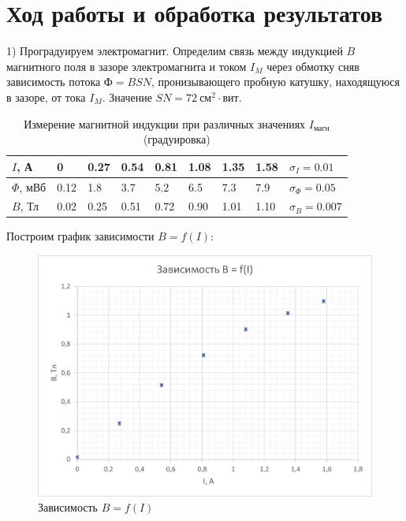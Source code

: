 \documentclass[a4paper, 14pt]{article}
\begin{document}
	\section*{Ход работы и обработка результатов}
	
	 1) Проградуируем электромагнит. Определим связь между индукцией $B$ магнитного поля в зазоре электромагнита и током $I_M$ через обмотку сняв зависимость потока $\text{Ф} = BSN$, пронизывающего пробную катушку, находящуюся в зазоре, от тока $I_M$. Значение $SN = 72~\text{см}^2 \cdot \text{вит}$.
		\begin{table}[h]
			\centering
			\begin{tabular}{|l|l|l|l|l|l|l|l|l|}
				\hline
				$I$, А  & 0 & 0.27 & 0.54  & 0.81   & 1.08     & 1.35   & 1.58 & $\sigma_I = 0.01$ \\ \hline
				$\Phi$, мВб & 0.12 & 1.8 & 3.7 & 5.2 & 6.5 & 7.3 & 7.9 &$\sigma_{\Phi} = 0.05$ \\ \hline
				$B$, Тл & 0.02 & 0.25 & 0.51 & 0.72 & 0.90 & 1.01 & 1.10 & $\sigma_B = 0.007$ \\ \hline
			\end{tabular}
			\caption{Измерение магнитной индукции при различных значениях $I_{\text{магн}}$ (градуировка)}
		\end{table}
	Построим график зависимости $B = f(I)$:
	
	\begin{figure}[h]
		\centering
		\includegraphics[scale = 1.05]{Gr1}
		\caption{Зависимость $B = f(I)$}
	\end{figure}
	
\end{document}
